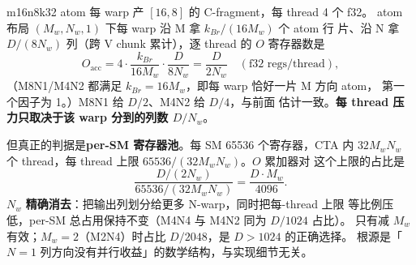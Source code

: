 m16n8k32 atom 每 warp 产 $[16,8]$ 的 C-fragment，每 thread 4 个 f32。
atom 布局 $(M_w,N_w,1)$ 下每 warp 沿 M 拿 $k_{Br}/(16M_w)$ 个 atom 行
片、沿 N 拿 $D/(8N_w)$ 列（跨 V chunk 累计），逐 thread 的 $O$
寄存器数是
\begin{equation}\label{eq:30-regthread}
O_{\text{acc}}
=4\cdot\frac{k_{Br}}{16M_w}\cdot\frac{D}{8N_w}
=\frac{D}{2N_w}\quad(\text{f32 regs/thread}),
\end{equation}
（M8N1/M4N2 都满足 $k_{Br}=16M_w$，即每 warp 恰好一片 M 方向 atom，
第一个因子为 1。）M8N1 给 $D/2$、M4N2 给 $D/4$，与前面
估计一致。\textbf{每 thread 压力只取决于该 warp 分到的列数
$D/N_w$}。

但真正的判据是\textbf{per-SM 寄存器池}。每 SM 65536 个寄存器，CTA 内
$32M_wN_w$ 个 thread，每 thread 上限 $65536/(32M_wN_w)$。$O$ 累加器对
这个上限的占比是
\begin{equation}\label{eq:30-smpool}
\frac{D/(2N_w)}{65536/(32M_wN_w)}=\frac{D\cdot M_w}{4096}.
\end{equation}
$N_w$ \textbf{精确消去}：把输出列划分给更多 N-warp，同时把每-thread 上限
等比例压低，per-SM 总占用保持不变（M4N4 与 M4N2 同为 $D/1024$ 占比）。
只有减 $M_w$ 有效；$M_w=2$（M2N4）时占比 $D/2048$，是 $D>1024$ 的正确选择。
根源是「$N=1$ 列方向没有并行收益」的数学结构，与实现细节无关。

